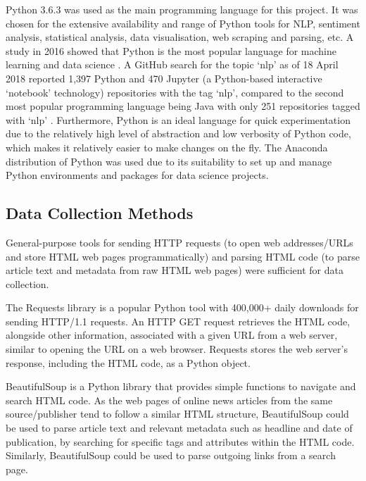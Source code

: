\documentclass{report}
\begin{document}
Python 3.6.3 \cite{Python} was used as the main programming language for this project.
It was chosen for the extensive availability and range of Python tools for NLP, sentiment analysis, statistical analysis, data visualisation, web scraping and parsing, etc.
A study in 2016 showed that Python is the most popular language for machine learning and data science \cite{puget2016most}.
A GitHub search for the topic `nlp' as of 18 April 2018 reported 1,397 Python and 470 Jupyter (a Python-based interactive `notebook' technology) repositories with the tag `nlp', compared to the second most popular programming language being Java with only 251 repositories tagged with `nlp' \cite{GitHubNLP}.
Furthermore, Python is an ideal language for quick experimentation due to the relatively high level of abstraction and low verbosity of Python code, which makes it relatively easier to make changes on the fly.
The Anaconda distribution of Python \cite{Anaconda} was used due to its suitability to set up and manage Python environments and packages for data science projects.

\subsection{Data Collection Methods} \label{tc-data-collection}
General-purpose tools for sending HTTP requests (to open web addresses/URLs and store HTML web pages programmatically) and parsing HTML code (to parse article text and metadata from raw HTML web pages) were sufficient for data collection.

The Requests library \cite{Requests} is a popular Python tool with 400,000+ daily downloads for sending HTTP/1.1 requests.
An HTTP GET request retrieves the HTML code, alongside other information, associated with a given URL from a web server, similar to opening the URL on a web browser. 
Requests stores the web server's response, including the HTML code, as a Python object.

BeautifulSoup \cite{BeautifulSoup} is a Python library that provides simple functions to navigate and search HTML code.
As the web pages of online news articles from the same source/publisher tend to follow a similar HTML structure, BeautifulSoup could be used to parse article text and relevant metadata such as headline and date of publication, by searching for specific tags and attributes within the HTML code.
Similarly, BeautifulSoup could be used to parse outgoing links from a search page.
\end{document}
